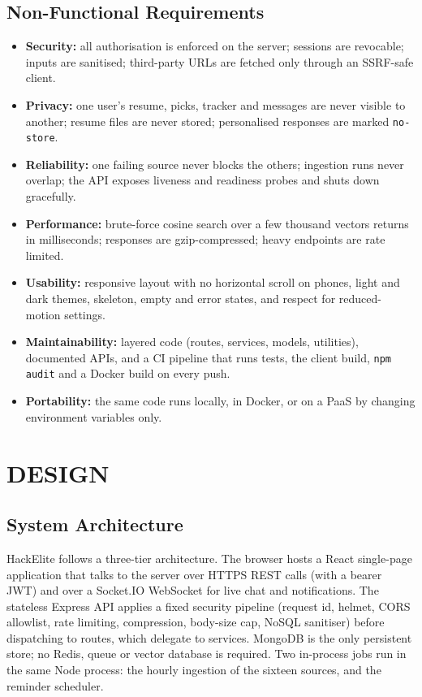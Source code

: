 \documentclass[12pt,a4paper]{report}
\begin{document}
\section{Non-Functional Requirements}
\begin{itemize}[leftmargin=*]
    \item \textbf{Security:} all authorisation is enforced on the server; sessions are revocable; inputs are sanitised; third-party URLs are fetched only through an SSRF-safe client.
    \item \textbf{Privacy:} one user's resume, picks, tracker and messages are never visible to another; resume files are never stored; personalised responses are marked \texttt{no-store}.
    \item \textbf{Reliability:} one failing source never blocks the others; ingestion runs never overlap; the API exposes liveness and readiness probes and shuts down gracefully.
    \item \textbf{Performance:} brute-force cosine search over a few thousand vectors returns in milliseconds; responses are gzip-compressed; heavy endpoints are rate limited.
    \item \textbf{Usability:} responsive layout with no horizontal scroll on phones, light and dark themes, skeleton, empty and error states, and respect for reduced-motion settings.
    \item \textbf{Maintainability:} layered code (routes, services, models, utilities), documented APIs, and a CI pipeline that runs tests, the client build, \texttt{npm audit} and a Docker build on every push.
    \item \textbf{Portability:} the same code runs locally, in Docker, or on a PaaS by changing environment variables only.
\end{itemize}

\chapter{DESIGN}

\section{System Architecture}
HackElite follows a three-tier architecture. The browser hosts a React single-page application that talks to the server over HTTPS REST calls (with a bearer JWT) and over a Socket.IO WebSocket for live chat and notifications. The stateless Express API applies a fixed security pipeline (request id, helmet, CORS allowlist, rate limiting, compression, body-size cap, NoSQL sanitiser) before dispatching to routes, which delegate to services. MongoDB is the only persistent store; no Redis, queue or vector database is required. Two in-process jobs run in the same Node process: the hourly ingestion of the sixteen sources, and the reminder scheduler.
\end{document}
